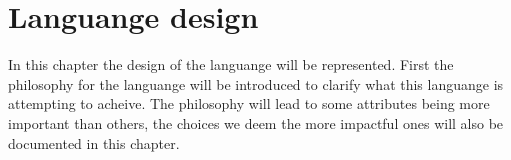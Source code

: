 \chapter{Languange design}
In this chapter the design of the languange will be represented.
First the philosophy for the languange will be introduced to clarify what this languange is attempting to acheive.
The philosophy will lead to some attributes being more important than others, the choices we deem the more impactful ones will also be documented in this chapter.


